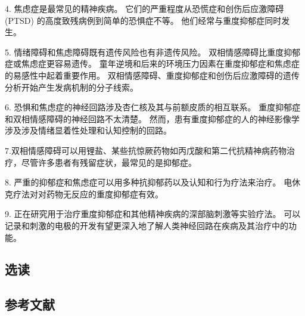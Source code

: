 4. 焦虑症是最常见的精神疾病。 它们的严重程度从恐慌症和创伤后应激障碍 (PTSD) 的高度致残病例到简单的恐惧症不等。 他们经常与重度抑郁症同时发生。 

5. 情绪障碍和焦虑障碍既有遗传风险也有非遗传风险。 双相情感障碍比重度抑郁症或焦虑症更容易遗传。 童年逆境和后来的环境压力因素在重度抑郁症和焦虑症的易感性中起着重要作用。 双相情感障碍、重度抑郁症和创伤后应激障碍的遗传分析开始产生发病机制的分子线索。 

6. 恐惧和焦虑症的神经回路涉及杏仁核及其与前额皮质的相互联系。 重度抑郁症和双相情感障碍的神经回路不太清楚。 然而，患有重度抑郁症的人的神经影像学涉及涉及情绪显着性处理和认知控制的回路。 

7.双相情感障碍可以用锂盐、某些抗惊厥药物如丙戊酸和第二代抗精神病药物治疗，尽管许多患者有残留症状，最常见的是抑郁症。

8. 严重的抑郁症和焦虑症可以用多种抗抑郁药以及认知和行为疗法来治疗。 电休克疗法对对药物无反应的重度抑郁症有效。 

9. 正在研究用于治疗重度抑郁症和其他精神疾病的深部脑刺激等实验疗法。 可以记录和刺激的电极的开发有望更深入地了解人类神经回路在疾病及其治疗中的功能。
\subsection{选读}
\subsection{参考文献}


